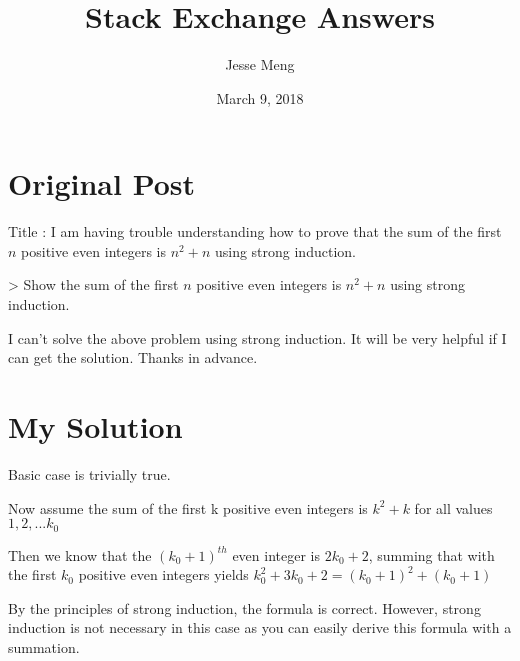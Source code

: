 \documentclass{article}
\title{Stack Exchange Answers}
\author{Jesse Meng }
\date{March 9, 2018}
\begin{document}
\maketitle

\section{Original Post}
Title : I am having trouble understanding how to prove that the sum of the first $n$ positive even integers is $n^2 + n$ using strong induction.

> Show the sum of the first $n$ positive even integers is $n^2 + n$ using strong induction.

I can't solve the above problem using strong induction. It will be very helpful if I can get the solution. Thanks in advance.
\section{My Solution}
Basic case is trivially true.

Now assume the sum of the first k positive even integers is $k^2+k$ for all values $1,2,...k_0$

Then we know that the $(k_0+1)^{th}$ even integer is $2k_0+2$, summing that with the first $k_0$ positive even integers yields $k_0^2+3k_0+2=(k_0+1)^2+(k_0+1)$

By the principles of strong induction, the formula is correct. However, strong induction is not necessary in this case as you can easily derive this formula with a summation.
\end{document}

